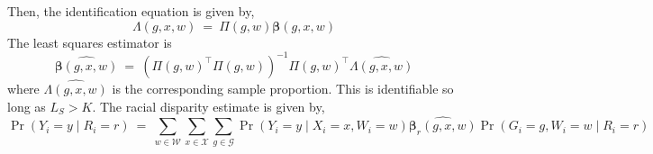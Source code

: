 \documentclass[11pt]{article}
\theoremstyle{plain}
\newcommand\spacingset[1]{\renewcommand{\baselinestretch}%
  {#1}\small\normalsize}
\newcommand{\cW}{\mathcal{W}}
\newcommand{\cG}{\mathcal{G}}
\newcommand{\cX}{\mathcal{X}}
\newcommand{\bbeta}{\bm{\beta}}
\begin{document}
Then, the identification equation is given by,
\begin{equation}
  \Lambda(g,x,w) \ = \ \Pi(g,w) \bbeta(g,x,w)
\end{equation}
The least squares estimator is
\begin{equation}
  \widehat{\bbeta(g,x,w)} \ = \ \left(\Pi(g,w)^\top\Pi(g,w)\right)^{-1} \Pi(g,w)^\top \widehat{\Lambda(g,x,w)}
\end{equation}
where $\widehat{\Lambda(g,x,w)}$ is the corresponding sample
proportion. This is identifiable so long as $L_S > K$.  The racial
disparity estimate is given by,
\begin{equation}
  \Pr(Y_i = y \mid R_i = r) \ = \ \sum_{w \in \cW} \sum_{x \in \cX}
  \sum_{g \in \cG} \Pr(Y_i = y \mid X_i = x, W_i = w)
  \widehat{\bbeta_r(g,x,w)} \Pr(G_i = g, W_i = w \mid R_i = r)
\end{equation}
    
\spacingset{1.5}

\end{document}
